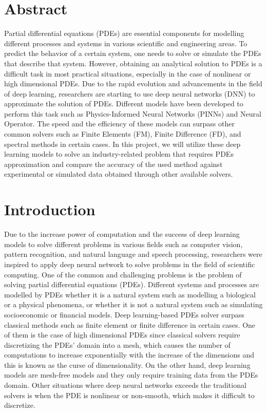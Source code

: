 \documentclass[a4paper, 12pt]{article}
\begin{document}

\onehalfspacing %
\section*{Abstract}
Partial differential equations (PDEs) are essential components for modelling different processes and systems in various scientific and engineering areas. To predict the behavior of a certain system, one needs to solve or simulate the PDEs that describe that system. However, obtaining an analytical solution to PDEs is a difficult task in most practical situations, especially in the case of nonlinear or high dimensional PDEs. Due to the rapid evolution and advancements in the field of deep learning, researchers are starting to use deep neural networks (DNN) to approximate the solution of PDEs. Different models have been developed to perform this task such as Physics-Informed Neural Networks (PINNs) and Neural Operator. The speed and the efficiency of these models can surpass other common solvers such as Finite Elements (FM), Finite Difference (FD), and spectral methods in certain cases. In this project, we will utilize these deep learning models to solve an industry-related problem that requires PDEs approximation and compare the accuracy of the used method against experimental or simulated data obtained through other available solvers.

\section*{Introduction}
Due to the increase power of computation and the success of deep learning models to solve different problems in various fields such as computer vision, pattern recognition, and natural language and speech processing, researchers were inspired to apply deep neural network to solve problems in the field of scientific computing. One of the common and challenging problems is the problem of solving partial differential equations (PDEs). Different systems and processes are modelled by PDEs whether it is a natural system such as modelling a biological or a physical phenomena, or whether it is not a natural system such as simulating socioeconomic or financial models. Deep learning-based PDEs solver surpass classical methods such as finite element or finite difference in certain cases. One of them is the case of high dimensional PDEs since classical solvers require discretizing the PDEs' domain into a mesh, which causes the number of computations to increase exponentially with the increase of the dimensions and this is known as the curse of dimensionality. On the other hand, deep learning models are mesh-free models and they only require training data from the PDEs domain. Other situations where deep neural networks exceeds the traditional solvers is when the PDE is nonlinear or non-smooth, which makes it difficult to discretize. 
\end{document}
